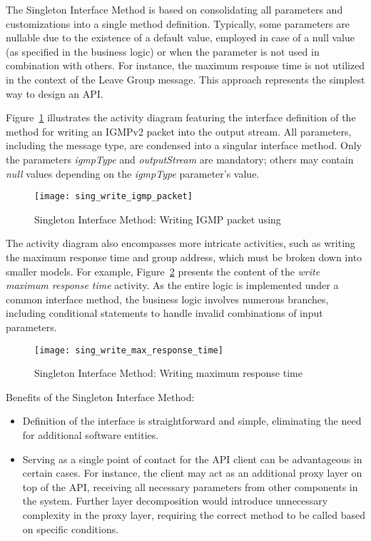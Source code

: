 The Singleton Interface Method is based on consolidating all parameters and customizations into a single
method definition.
Typically, some parameters are nullable due to the existence of a default value, employed in case of a null value
(as specified in the business logic) or when the parameter is not used in combination with others.
For instance, the maximum response time is not utilized in the context of the Leave Group message.
This approach represents the simplest way to design an API\@.

Figure~\ref{fig:sing_write_igmp_packet} illustrates the activity diagram featuring the interface definition
of the method for writing an IGMPv2 packet into the output stream.
All parameters, including the message type, are condensed into a singular interface method.
Only the parameters \textit{igmpType} and \textit{outputStream} are mandatory; others may contain \textit{null} values
depending on the \textit{igmpType} parameter's value.

\begin{figure}[!htb]
    \centering
    \texttt{[image: sing\_write\_igmp\_packet]}
    \caption{Singleton Interface Method: Writing IGMP packet using }
    \label{fig:sing_write_igmp_packet}
\end{figure}

The activity diagram also encompasses more intricate activities, such as writing the maximum response time
and group address, which must be broken down into smaller models.
For example, Figure~\ref{fig:sing_write_max_response_time} presents the content of the
\textit{write maximum response time} activity.
As the entire logic is implemented under a common interface method, the business logic involves numerous branches,
including conditional statements to handle invalid combinations of input parameters.

\begin{figure}[!htb]
    \centering
    \texttt{[image: sing\_write\_max\_response\_time]}
    \caption{Singleton Interface Method: Writing maximum response time}
    \label{fig:sing_write_max_response_time}
\end{figure}

Benefits of the Singleton Interface Method:

\begin{itemize}
    \item
    Definition of the interface is straightforward and simple, eliminating the need for additional software entities.
    \item
    Serving as a single point of contact for the API client can be advantageous in certain cases.
    For instance, the client may act as an additional proxy layer on top of the API,
    receiving all necessary parameters from other components in the system.
    Further layer decomposition would introduce unnecessary complexity in the proxy layer,
    requiring the correct method to be called based on specific conditions.
\end{itemize}

